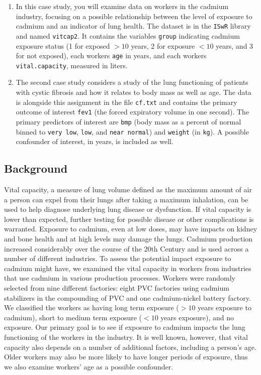 \documentclass{article}
\begin{document}
	\begin{enumerate}
		\item In this case study, you will examine data on workers in the cadmium industry, focusing on a possible relationship between the level of exposure to cadmium and an indicator of lung health. The dataset is in the \texttt{ISwR} library and named \texttt{vitcap2}. It contains the variables \texttt{group} indicating cadmium exposure status (1 for exposed $>10$ years, 2 for exposure $<10$ years, and 3 for not exposed), each workers \texttt{age} in years, and each workers \texttt{vital.capacity}, measured in liters.
		
		\item The second case study considers a study of the lung functioning of patients with cystic fibrosis and how it relates to body mass as well as age. The data is alongside this assignment in the file \texttt{cf.txt} and contains the primary outcome of interest \texttt{fev1} (the forced expiratory volume in one second). The primary predictors of interest are \texttt{bmp} (body mass as a percent of normal binned to \texttt{very low}, \texttt{low}, and \texttt{near normal}) and \texttt{weight} (in \texttt{kg}). A possible confounder of interest,  in years, is included as well.
	\end{enumerate}

		\newpage
	\subsection*{Background}
				
		Vital capacity, a measure of lung volume defined as the maximum amount of air a person can expel from their lungs after taking a maximum inhalation, can be used to help diagnose underlying lung disease or dysfunction. If vital capacity is lower than expected, further testing for possible disease or other complications is warranted. Exposure to cadmium, even at low doses, may have impacts on kidney and bone health and at high levels may damage the lungs. Cadmium production increased considerably over the course of the 20th Century and is used across a number of different industries. To assess the potential impact exposure to cadmium might have, we examined the vital capacity in workers from industries that use cadmium in various production processes. Workers were randomly selected from nine different factories: eight PVC factories using cadmium stabilizers in the compounding of PVC and one cadmium-nickel battery factory. We classified the workers as having long term exposure ($>10$ years exposure to cadmium), short to medium term exposure ($<10$ years exposure), and no exposure. Our primary goal is to see if exposure to cadmium impacts the lung functioning of the workers in the industry. It is well known, however, that vital capacity also depends on a number of additional factors, including a person's age. Older workers may also be more likely to have longer periods of exposure, thus we also examine workers' age as a possible confounder.
\end{document}
